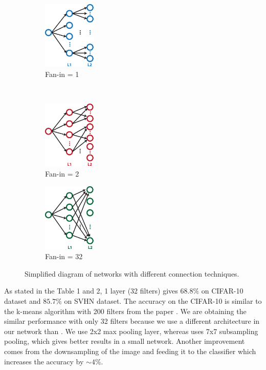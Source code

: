 \documentclass{article} %
\begin{document}
\begin{figure}
        \centering
         \label{fig-secondconnex}
        \begin{subfigure}[b]{0.3\textwidth}
                \centering
                \includegraphics[width=1.0in]{fig-diagram-fanin1.eps}
                \caption{Fan-in = 1}
        \end{subfigure}%
        ~%
          \begin{subfigure}[b]{0.3\textwidth}
                \centering
                \includegraphics[width=1.0in]{fig-diagram-fanin2.eps}
                \caption{Fan-in = 2}
        \end{subfigure}%
        \begin{subfigure}[b]{0.3\textwidth}
                \centering
                \includegraphics[width=1.0in]{fig-diagram-faninall.eps}
                \caption{Fan-in = 32}
        \end{subfigure}
        \caption{Simplified diagram of networks with different connection techniques.}
\end{figure}


As stated in the Table 1 and 2, 1 layer (32 filters) gives $68.8\%$ on CIFAR-10 dataset and  $85.7\%$ on SVHN dataset.
The accuracy on the CIFAR-10 is similar to the k-means algorithm with 200 filters from the paper \cite{coates_analysis_2011}.
We are obtaining the similar performance with only 32 filters because we use a different architecture in our network than \cite{coates_analysis_2011}.
We use 2x2 max pooling layer, whereas \cite{coates_analysis_2011} uses 7x7 subsampling pooling, which gives better results in a small network.
Another improvement comes from the downsampling of the image and feeding it to the classifier which increases the accuracy by  $\sim 4\%$. 
\end{document}
